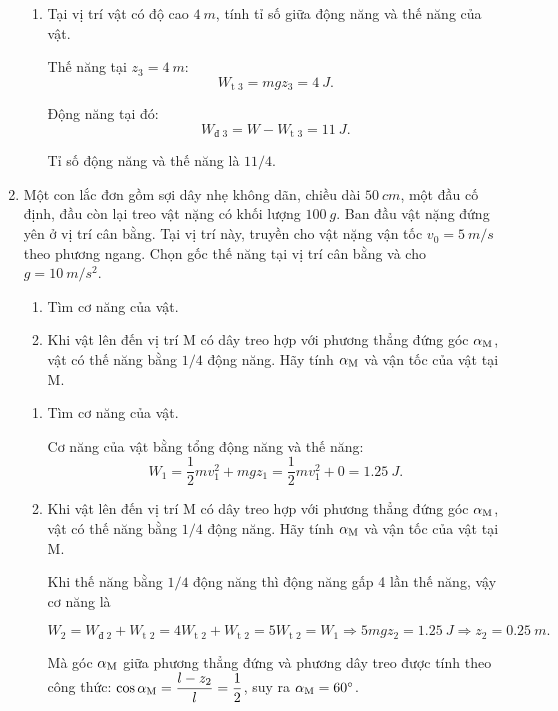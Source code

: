 \begin{enumerate}[label=\bfseries Câu \arabic*:, leftmargin=1.5cm]
{\begin{enumerate}[label=\alph*)]
			\item Tại vị trí vật có độ cao $\SI{4}{m}$, tính tỉ số giữa động năng và thế năng của vật.
			
			Thế năng tại $z_3=\SI{4}{m}$:
			$$W_\text{t 3} = mgz_3 = \SI{4}{J}.$$
			
			Động năng tại đó:
			$$W_\text{đ 3} = W - W_\text{t 3} = \SI{11}{J}.$$
			
			Tỉ số động năng và thế năng là $11/4$.
		\end{enumerate}
	}

	\item {}
	
	
	{
		Một con lắc đơn gồm sợi dây nhẹ không dãn, chiều dài $\SI{50}{cm}$, một đầu cố định, đầu còn lại treo vật nặng có khối lượng $\SI{100}{g}$. Ban đầu vật nặng đứng yên ở vị trí cân bằng. Tại vị trí này, truyền cho vật nặng vận tốc $v_0=\SI{5}{m/s}$ theo phương ngang. Chọn gốc thế năng tại vị trí cân bằng và cho $g=\SI{10}{m/s^2}$.
		\begin{enumerate}[label=\alph*)]
			\item Tìm cơ năng của vật.
			\item Khi vật lên đến vị trí M có dây treo hợp với phương thẳng đứng góc $\alpha_\text M$, vật có thế năng bằng $1/4$ động năng. Hãy tính $\alpha_\text M$ và vận tốc của vật tại M.
		\end{enumerate}
	}
	
	\hideall
	{	
		\begin{enumerate}[label=\alph*)]
			\item Tìm cơ năng của vật.
			
			Cơ năng của vật bằng tổng động năng và thế năng:
			$$W_1 = \dfrac{1}{2}mv_1^2 + mgz_1 = \dfrac{1}{2}mv_1^2 + 0 = \SI{1.25}{J}.$$
			
			\item Khi vật lên đến vị trí M có dây treo hợp với phương thẳng đứng góc $\alpha_\text M$, vật có thế năng bằng $1/4$ động năng. Hãy tính $\alpha_\text M$ và vận tốc của vật tại M.
			
			Khi thế năng bằng $1/4$ động năng thì động năng gấp 4 lần thế năng, vậy cơ năng là
			
			$$W_2 = W_\text{đ 2} + W_\text{t 2} = 4 W_\text{t 2} + W_\text{t 2} = 5 W_\text{t 2} = W_1 \Rightarrow 5mgz_2 = \SI{1.25}{J} \Rightarrow z_2 = \SI{0.25}{m}.$$
			
			Mà góc $\alpha_\text M$ giữa phương thẳng đứng và phương dây treo được tính theo công thức: $\cos \alpha_\text M = \dfrac{l-z_2}{l} = \dfrac{1}{2}$, suy ra $\alpha_\text M = 60^\circ$.
			

\end{enumerate}}
\end{enumerate}
